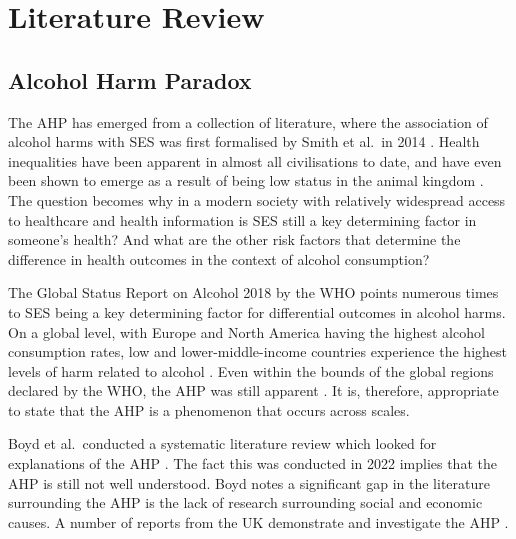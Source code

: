 \chapter{Literature Review}



\section{Alcohol Harm Paradox}

The \ac{AHP} has emerged from a collection of literature, where the association of alcohol harms with \ac{SES} was first formalised by Smith et al.~in 2014 \cite{ahpOrigin}. Health inequalities have been apparent in almost all civilisations to date, and have even been shown to emerge as a result of being low status in the animal kingdom \cite{primateSocialDeterminants, Krieger1997}. The question becomes why in a modern society with relatively widespread access to healthcare and health information is \ac{SES} still a key determining factor in someone's health? And what are the other risk factors that determine the  difference in health outcomes in the context of alcohol consumption?

The Global Status Report on Alcohol 2018 by the \ac{WHO} points numerous times to \ac{SES} being a key determining factor for  differential outcomes in alcohol harms. On a global level, with Europe and North America having the highest alcohol consumption rates, low and lower-middle-income countries experience the highest levels of harm related to alcohol \cite{WHOGlobalStatusReportFull}. Even within the bounds of the global regions declared by the \ac{WHO}, the \ac{AHP} was still apparent \cite{WHOGlobalStatusReportFull}. It is, therefore, appropriate to state that the \ac{AHP} is a phenomenon that occurs across scales. 

Boyd et al.~conducted a systematic literature review which looked for explanations of the \ac{AHP} \cite{Boyd2022}. The fact this was conducted in 2022 implies that the \ac{AHP} is still not well understood. Boyd notes a significant gap in the literature surrounding the \ac{AHP} is the lack of research surrounding social and economic causes. A number of reports from the UK demonstrate and investigate the \ac{AHP} \cite{scotlandAlcohol2022, ahpInterventions, ahp2016, ahpWhatNext}. 

